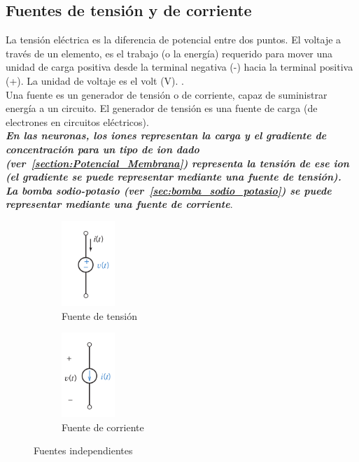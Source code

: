 \subsection{Fuentes de tensión y de corriente}
La tensión eléctrica es la diferencia de potencial entre dos puntos. El voltaje a través de un elemento, es el trabajo (o la energía) requerido para mover una unidad de carga positiva desde la terminal negativa (-) hacia la terminal positiva (+). La unidad de voltaje es el volt (V). \cite{dorf2013introduction}.\\
Una fuente es un generador de tensión o de corriente, capaz de suministrar energía a un circuito. El generador de tensión es una fuente de carga (de electrones en circuitos eléctricos).\medskip \\ 
\textbf{\emph{En las neuronas, los iones representan la carga y el gradiente de concentración para un tipo de ion dado (ver~\ref{section:Potencial_Membrana}) representa la tensión de ese ion (el gradiente se puede representar mediante una fuente de tensión).}}\medskip \\
\textbf{\emph{La bomba sodio-potasio (ver~\ref{sec:bomba_sodio_potasio}) se puede representar mediante una fuente de corriente}}.
\begin{figure}[htbp!]
        \centering
        \begin{subfigure}[b]{0.25\textwidth}
            \centering
            \includegraphics[width=2cm]{figures/fuente_tension.png}
            \caption{Fuente de tensión}
            \label{fig:fuente_tension}
        \end{subfigure}
       \hspace{0.5cm}
        \begin{subfigure}[b]{0.25\textwidth}  
            \centering 
            \includegraphics[width=2.0cm]{figures/fuente_corriente.png}
            \caption{Fuente de corriente}
            \label{fig:fuente_corriente}
        \end{subfigure}
        \quad
        \caption{Fuentes independientes}
        \label{fig:fuentes_independientes}
\end{figure}
